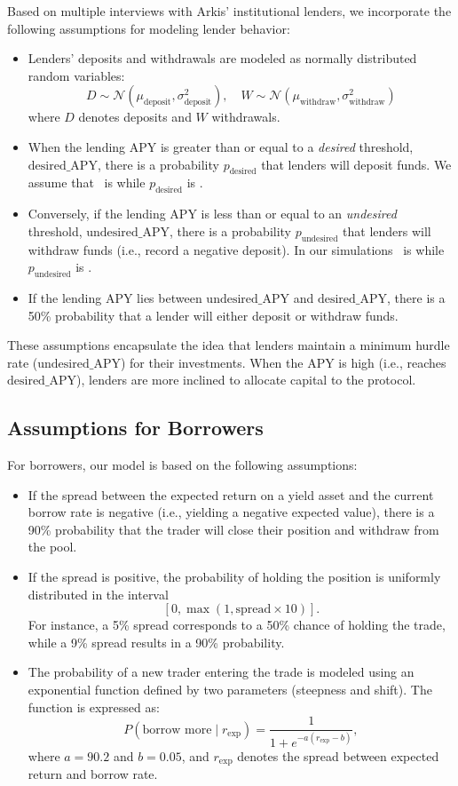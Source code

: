 \documentclass[12pt]{article}
\begin{document}
Based on multiple interviews with Arkis' institutional lenders, we incorporate the following assumptions for modeling lender behavior:
\begin{itemize}
    \item Lenders' deposits and withdrawals are modeled as normally distributed random variables:
    \[
    D \sim \mathcal{N}(\mu_{\text{deposit}}, \sigma_{\text{deposit}}^2), \quad W \sim \mathcal{N}(\mu_{\text{withdraw}}, \sigma_{\text{withdraw}}^2)
    \]
    where \(D\) denotes deposits and \(W\) withdrawals.
    \item When the lending APY is greater than or equal to a \emph{desired} threshold, \(\text{desired\_APY}\), there is a probability \(p_{\text{desired}}\) that lenders will deposit funds. We assume that \ is  while \(p_{\text{desired}}\) is .
    \item Conversely, if the lending APY is less than or equal to an \emph{undesired} threshold, \(\text{undesired\_APY}\), there is a probability \(p_{\text{undesired}}\) that lenders will withdraw funds (i.e., record a negative deposit). In our simulations \ is  while \(p_{\text{undesired}}\) is .
    \item If the lending APY lies between \(\text{undesired\_APY}\) and \(\text{desired\_APY}\), there is a 50\% probability that a lender will either deposit or withdraw funds.
\end{itemize}
These assumptions encapsulate the idea that lenders maintain a minimum hurdle rate (\(\text{undesired\_APY}\)) for their investments. When the APY is high (i.e., reaches \(\text{desired\_APY}\)), lenders are more inclined to allocate capital to the protocol.

\subsection{Assumptions for Borrowers}

For borrowers, our model is based on the following assumptions:
\begin{itemize}
    \item If the spread between the expected return on a yield asset and the current borrow rate is negative (i.e., yielding a negative expected value), there is a 90\% probability that the trader will close their position and withdraw from the pool.
    \item If the spread is positive, the probability of holding the position is uniformly distributed in the interval 
    \[
    \left[0, \max\left(1, \text{spread} \times 10\right)\right].
    \]
    For instance, a 5\% spread corresponds to a 50\% chance of holding the trade, while a 9\% spread results in a 90\% probability.
    \item The probability of a new trader entering the trade is modeled using an exponential function defined by two parameters (steepness and shift). The function is expressed as:
    \[
    P(\text{borrow more} \mid r_{\text{exp}}) = \frac{1}{1 + e^{-a (r_{\text{exp}} - b)}},
    \]
    where \(a = 90.2\) and \(b = 0.05\), and \(r_{\text{exp}}\) denotes the spread between expected return and borrow rate.
\end{itemize}
\end{document}
